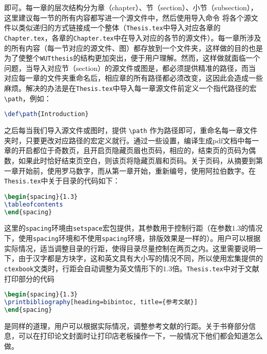 即可。每一章的层次结构分为章（chapter）、节（section）、小节（subsection），这里建议每一节的所有内容都写进一个源文件中，然后使用导入命令 \verb"" 将各个源文件以类似递归的方式链接成一个整体（\texttt{Thesis.tex}中导入对应各章的\texttt{Chapter.tex}，各章的\texttt{Chapter.tex}中在导入对应的各节的源文件）。每一章所涉及的所有内容（每一节对应的源文件、图）都存放到一个文件夹，这样做的目的也是为了使整个\texttt{WUTthesis}的结构更加突出，便于用户理解。然而，这样做就面临一个问题，当导入对应节（section）的源文件或图是，都必须提供精准的路径，而当对应每一章的文件夹重命名后，相应章的所有路径都必须改变，这因此会造成一些麻烦。解决的办法是在\texttt{Thesis.tex}中导入每一章源文件前定义一个指代路径的宏 \verb"\path"，例如：
\begin{lstlisting}[language=TeX]
\def\path{Introduction}
\end{lstlisting}
之后每当我们导入源文件或图时，提供 \verb"\path" 作为路径即可，重命名每一章文件夹时，只要更改对应路径的宏定义就行。通过一些设置，编译生成pdf文档中每一章的开启都位于奇数页，且开启页隐藏页眉也页码，相应的，结束页的页码为偶数，如果此时恰好结束页空白，则该页将隐藏页眉和页码。关于页码，从摘要到第一章开始前，使用罗马数字，而从第一章开始，重新编号，使用阿拉伯数字。在\texttt{Thesis.tex}中关于目录的代码如下：
\begin{lstlisting}[language=TeX]
\begin{spacing}{1.3}
\tableofcontents
\end{spacing}
\end{lstlisting}
这里的\texttt{spacing}环境由\texttt{setspace}宏包提供，其参数用于控制行距（在参数$1.3$的情况下，使用\texttt{spacing}环境和不使用\texttt{spacing}环境，排版效果是一样的）。用户可以根据实际情况，适当调整目录的行距，使得目录尽量控制在两页之内。这里需要说明一下，由于汉字都是方块字，这和英文具有大小写的情况不同，所以使用{\CTeX}宏集提供的\texttt{ctexbook}文类时，行距会自动调整为英文情形下的$1.3$倍。\texttt{Thesis.tex}中对于文献打印部分的代码
\begin{lstlisting}[language=TeX]
\begin{spacing}{1.3}
\printbibliography[heading=bibintoc, title={参考文献}]
\end{spacing}
\end{lstlisting}
是同样的道理，用户可以根据实际情况，调整参考文献的行距。{\color{red}关于书脊部分信息，可以在打印论文封面时让打印店老板操作一下，一般情况下他们都会知道怎么做。}


